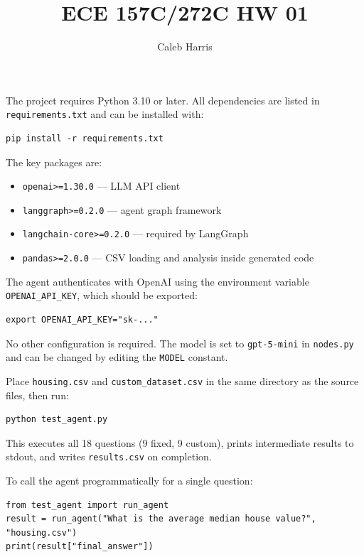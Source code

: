 \documentclass[12pt, oneside]{report}
\title{ECE 157C/272C HW 01}
\author{Caleb Harris}
\date{}
\begin{document}




The project requires Python 3.10 or later. All dependencies are listed in \texttt{requirements.txt} and can be installed with:

\begin{verbatim}
pip install -r requirements.txt
\end{verbatim}

The key packages are:

\begin{itemize}
    \item \texttt{openai>=1.30.0} --- LLM API client
    \item \texttt{langgraph>=0.2.0} --- agent graph framework
    \item \texttt{langchain-core>=0.2.0} --- required by LangGraph
    \item \texttt{pandas>=2.0.0} --- CSV loading and analysis inside generated code
\end{itemize}


The agent authenticates with OpenAI using the environment variable \texttt{OPENAI\_API\_KEY}, which should be exported:

\begin{verbatim}
export OPENAI_API_KEY="sk-..."
\end{verbatim}

No other configuration is required. The model is set to \texttt{gpt-5-mini} in \texttt{nodes.py} and can be changed by editing the \texttt{MODEL} constant.


Place \texttt{housing.csv} and \texttt{custom\_dataset.csv} in the same directory as the source files, then run:

\begin{verbatim}
python test_agent.py
\end{verbatim}

This executes all 18 questions (9 fixed, 9 custom), prints intermediate results to stdout, and writes \texttt{results.csv} on completion.

To call the agent programmatically for a single question:

\begin{verbatim}
from test_agent import run_agent
result = run_agent("What is the average median house value?", "housing.csv")
print(result["final_answer"])
\end{verbatim}
\end{document}
